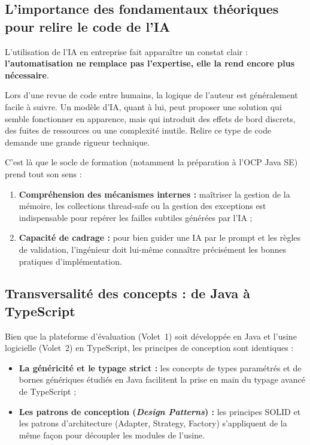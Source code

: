 \documentclass{tnreport}
\begin{document}
\subsection{L'importance des fondamentaux théoriques pour relire le code de l'IA}
\label{subsec:exigence_theorique_ia}

L'utilisation de l'IA en entreprise fait apparaître un constat clair : \textbf{l'automatisation ne remplace pas l'expertise, elle la rend encore plus nécessaire}.

Lors d'une revue de code entre humains, la logique de l'auteur est généralement facile à suivre. Un modèle d'IA, quant à lui, peut proposer une solution qui semble fonctionner en apparence, mais qui introduit des effets de bord discrets, des fuites de ressources ou une complexité inutile. Relire ce type de code demande une grande rigueur technique.

C'est là que le socle de formation (notamment la préparation à l'OCP Java SE) prend tout son sens :
\begin{enumerate}
    \item \textbf{Compréhension des mécanismes internes :} maîtriser la gestion de la mémoire, les collections thread-safe ou la gestion des exceptions est indispensable pour repérer les failles subtiles générées par l'IA ;
    \item \textbf{Capacité de cadrage :} pour bien guider une IA par le prompt et les règles de validation, l'ingénieur doit lui-même connaître précisément les bonnes pratiques d'implémentation.
\end{enumerate}

\subsection{Transversalité des concepts : de Java à TypeScript}
\label{subsec:transversalite_paradigmes}

Bien que la plateforme d'évaluation (Volet~1) soit développée en Java et l'usine logicielle (Volet~2) en TypeScript, les principes de conception sont identiques :
\begin{itemize}
    \item \textbf{La généricité et le typage strict :} les concepts de types paramétrés et de bornes génériques étudiés en Java facilitent la prise en main du typage avancé de TypeScript ;
    \item \textbf{Les patrons de conception (\textit{Design Patterns}) :} les principes SOLID et les patrons d'architecture (Adapter, Strategy, Factory) s'appliquent de la même façon pour découpler les modules de l'usine.
\end{itemize}
\end{document}
